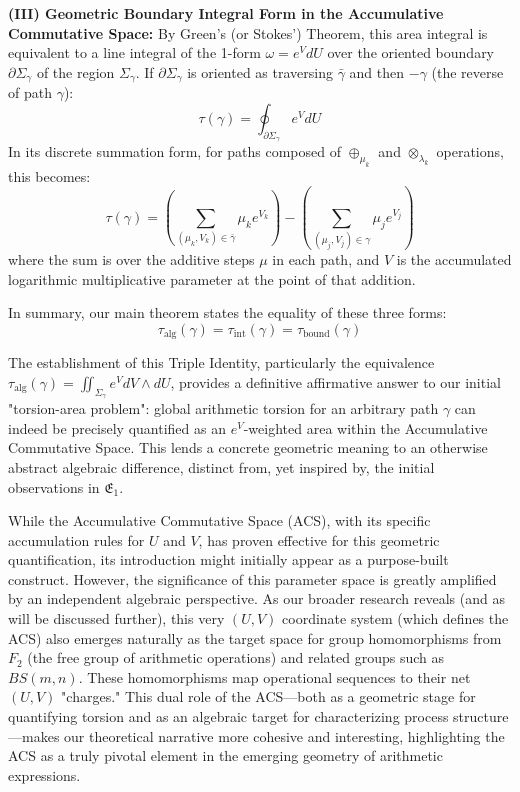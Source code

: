 \textbf{(III) Geometric Boundary Integral Form in the Accumulative Commutative Space:}
By Green's (or Stokes') Theorem, this area integral is equivalent to a line integral of the 1-form $\omega = e^V dU$ over the oriented boundary $\partial \Sigma_\gamma$ of the region $\Sigma_\gamma$. If $\partial \Sigma_\gamma$ is oriented as traversing $\bar{\gamma}$ and then $-\gamma$ (the reverse of path $\gamma$):
\[ \tau(\gamma) = \oint_{\partial \Sigma_\gamma} e^V dU \]
In its discrete summation form, for paths composed of $\oplus_{\mu_k}$ and $\otimes_{\lambda_k}$ operations, this becomes:
\[ \tau(\gamma) = \left(\sum_{(\mu_k, V_k) \in \bar{\gamma}} \mu_k e^{V_k}\right) - \left(\sum_{(\mu_j, V_j) \in \gamma} \mu_j e^{V_j}\right) \]
where the sum is over the additive steps $\mu$ in each path, and $V$ is the accumulated logarithmic multiplicative parameter at the point of that addition.

In summary, our main theorem states the equality of these three forms:
\begin{equation}
\tau_{\text{alg}}(\gamma) = \tau_{\text{int}}(\gamma) = \tau_{\text{bound}}(\gamma)
\label{eq:triple_identity_final_narrative_enhanced_acs}
\end{equation}

The establishment of this Triple Identity, particularly the equivalence $\tau_{\text{alg}}(\gamma) = \iint_{\Sigma_\gamma} e^V dV \wedge dU$, provides a definitive affirmative answer to our initial "torsion-area problem": global arithmetic torsion for an arbitrary path $\gamma$ can indeed be precisely quantified as an $e^V$-weighted area within the Accumulative Commutative Space. This lends a concrete geometric meaning to an otherwise abstract algebraic difference, distinct from, yet inspired by, the initial observations in $\mathfrak{E}_1$.

While the Accumulative Commutative Space (ACS), with its specific accumulation rules for $U$ and $V$, has proven effective for this geometric quantification, its introduction might initially appear as a purpose-built construct. However, the significance of this parameter space is greatly amplified by an independent algebraic perspective. As our broader research reveals (and as will be discussed further), this very $(U,V)$ coordinate system (which defines the ACS) also emerges naturally as the target space for group homomorphisms from $F_2$ (the free group of arithmetic operations) and related groups such as $BS(m,n)$. These homomorphisms map operational sequences to their net $(U,V)$ "charges." This dual role of the ACS—both as a geometric stage for quantifying torsion and as an algebraic target for characterizing process structure—makes our theoretical narrative more cohesive and interesting, highlighting the ACS as a truly pivotal element in the emerging geometry of arithmetic expressions.

